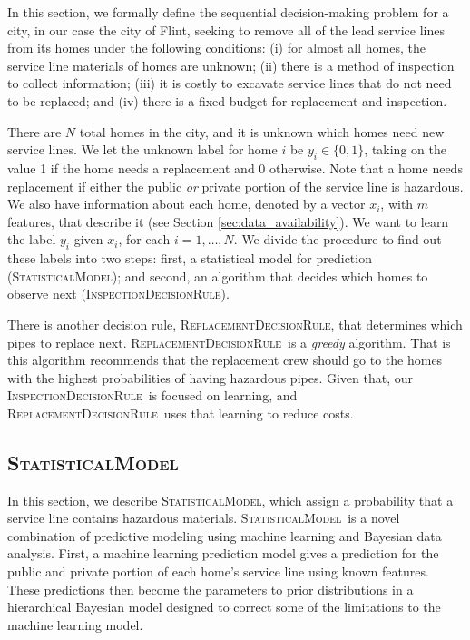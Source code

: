 \documentclass[sigconf]{acmart}
\def\statmodel{\textsc{StatisticalModel}\xspace}
\def\druleHVI{\textsc{InspectionDecisionRule}\xspace}
\def\druleSLR{\textsc{ReplacementDecisionRule}\xspace}
\begin{document}
In this section, we formally define the sequential decision-making problem for a city, in our case the city of Flint, seeking to remove all of the lead service lines from its homes under the following conditions:
(i) for almost all homes, the service line materials of homes are unknown;
(ii) there is a method of inspection to collect information;
(iii) it is costly to excavate service lines that do not need to be replaced; and
(iv) there is a fixed budget for replacement and inspection.


There are $N$ total homes in the city, and it is unknown which homes need new service lines. We let the unknown label for home $i$ be $y_i \in \{0,1\}$, taking on the value 1 if the home needs a replacement and 0 otherwise.  Note that a home needs replacement if either the public \emph{or} private portion of the service line is hazardous. We also have information about each home, denoted by a vector $x_i$, with $m$ features, that describe it (see Section \ref{sec:data_availability}).  We want to learn the label $y_i$ given $x_i$, for each $i=1,\ldots,N$.  We divide the procedure to find out these labels into two steps: first, a statistical model for prediction (\statmodel); and second, an algorithm that decides which homes to observe next (\druleHVI).

There is another decision rule, \druleSLR, that determines which pipes to replace next. \druleSLR\ is a \emph{greedy} algorithm. That is this algorithm recommends that the replacement crew should go to the homes with the highest probabilities of having hazardous pipes. Given that, our \druleHVI\ is focused on learning, and \druleSLR\ uses that learning to reduce costs. 

\subsection{\statmodel}
\label{sec:model_for_prediction}


In this section, we describe \statmodel, which assign a probability that a service line contains hazardous materials.  \statmodel\  is a novel combination of predictive modeling using machine learning and Bayesian data analysis.  First, a machine learning prediction model gives a prediction for the public and private portion of each home's service line using known features.  These predictions then become the parameters to prior distributions in a hierarchical Bayesian model designed to correct some of the limitations to the machine learning model.
\end{document}
